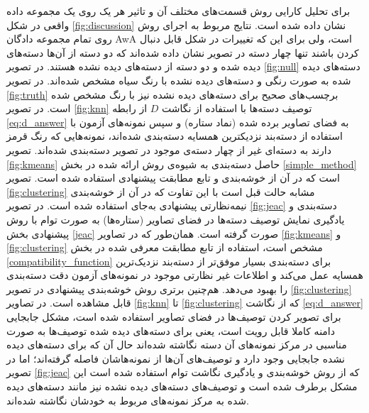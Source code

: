 برای تحلیل کارایی روش قسمت‌های مختلف آن و تاثیر هر یک  روی یک مجموعه داده واقعی در شکل
\ref{fig:discussion}
 نشان داده شده است. نتایج مربوط به اجرای روش روی تمام مجموعه دادگان AwA است، ولی برای این که تغییرات در شکل قابل دنبال کردن باشند تنها چهار دسته در  تصویر نشان داده شده‌اند که دو دسته از آن‌ها دسته‌های دیده شده و دو دسته از دسته‌های دیده نشده هستند. در تصویر
\ref{fig:null}
دسته‌های دیده شده به صورت رنگی و دسته‌های دیده نشده با رنگ سیاه مشخص شده‌اند. در تصویر
\ref{fig:truth}
برچسب‌های صحیح برای دسته‌های دیده نشده نیز با رنگ مشخص شده است. در تصویر
\ref{fig:knn}
توصیف دسته‌ها با استفاده از نگاشت $D$ از رابطه \eqref{eq:d_answer} به فضای تصاویر برده شده (نماد ستاره) و سپس نمونه‌های آزمون با استفاده از دسته‌بند نزدیکترین همسایه دسته‌بندی شده‌اند، نمونه‌هایی که رنگ قرمز دارند به دسته‌ای غیر از چهار دسته‌ی موجود در تصویر دسته‌بندی شده‌اند. تصویر
\ref{fig:kmeans}
حاصل دسته‌بندی به شیوه‌ی روش ارائه شده در بخش \ref{simple_method} است که در آن از خوشه‌بندی  و تابع مطابقت پیشنهادی استفاده شده است. تصویر
\ref{fig:clustering}
مشابه حالت قبل است با این تفاوت که در آن از خوشه‌بندی نیمه‌نظارتی پیشنهادی به‌جای  استفاده شده است. در تصویر
\ref{fig:jeac}
دسته‌بندی و یادگیری نمایش توصیف دسته‌ها در فضای تصاویر (ستاره‌ها) به صورت توام با روش پیشنهادی بخش \ref{jeac} صورت گرفته است.
همان‌طور که در تصاویر
\ref{fig:kmeans} و \ref{fig:clustering}
مشخص است، استفاده از  تابع مطابقت معرفی شده در بخش \ref{compatibility_function} برای دسته‌بندی بسیار موفق‌تر از دسته‌بند نزدیک‌ترین همسایه عمل می‌کند و اطلاعات غیر نظارتی موجود در نمونه‌های آزمون دقت  دسته‌بندی را بهبود می‌دهد. هم‌چنین برتری روش خوشه‌بندی پیشنهادی در تصویر \ref{fig:clustering} قابل مشاهده است. در تصاویر \ref{fig:knn} تا \ref{fig:clustering} که از نگاشت  \eqref{eq:d_answer} برای تصویر کردن توصیف‌ها در فضای تصاویر استفاده شده است، مشکل جابجایی دامنه کاملا قابل رویت است، یعنی برای دسته‌های دیده شده توصیف‌ها به صورت مناسبی در مرکز نمونه‌های آن دسته نگاشته شده‌اند حال آن که برای دسته‌های دیده نشده جابجایی وجود دارد و توصیف‌های آن‌ها از نمونه‌هاشان فاصله گرفته‌اند؛ اما در تصویر
\ref{fig:jeac}
که از روش خوشه‌بندی و یادگیری نگاشت توام استفاده شده است این مشکل برطرف شده است و توصیف‌های دسته‌های دیده نشده نیز مانند دسته‌های دیده شده به مرکز نمونه‌های مربوط به خودشان نگاشته شده‌اند.

